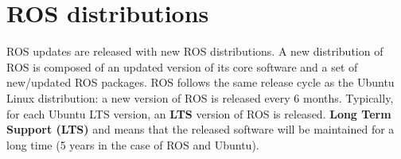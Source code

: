\documentclass[../../main]{subfiles}
\begin{document}
\section{ROS distributions}
ROS updates are released with new ROS distributions. A new distribution of ROS is composed of an updated version of its core software and a set of new/updated ROS packages. ROS follows the same release cycle as the Ubuntu Linux distribution: a new version of ROS is released every 6 months. Typically, for each Ubuntu LTS version, an \textbf{LTS} version of ROS is released. \textbf{Long Term Support (LTS)} and means that the released software will be maintained for a long time (5 years in the case of ROS and Ubuntu).
\end{document}
